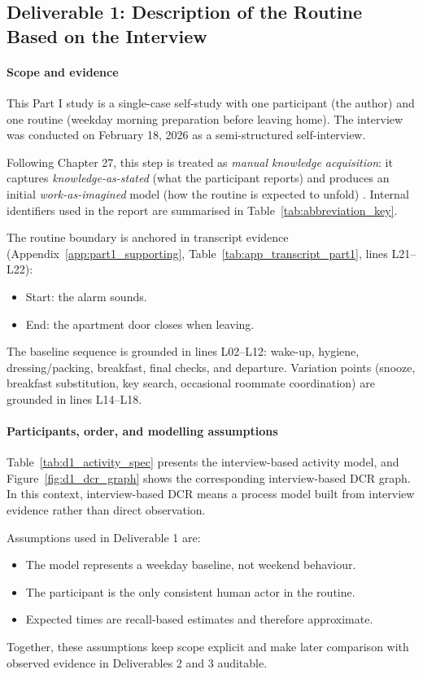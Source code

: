 \subsection{Deliverable 1: Description of the Routine Based on the Interview}
\label{sec:deliverable1}

\paragraph*{Scope and evidence}
This Part I study is a single-case self-study with one participant (the author) and one routine (weekday morning preparation before leaving home). The interview was conducted on February 18, 2026 as a semi-structured self-interview.

Following Chapter 27, this step is treated as \textit{manual knowledge acquisition}: it captures \textit{knowledge-as-stated} (what the participant reports) and produces an initial \textit{work-as-imagined} model (how the routine is expected to unfold) . Internal identifiers used in the report are summarised in Table~\ref{tab:abbreviation_key}.

The routine boundary is anchored in transcript evidence (Appendix~\ref{app:part1_supporting}, Table~\ref{tab:app_transcript_part1}, lines L21--L22):
\begin{itemize}
  \item Start: the alarm sounds.
  \item End: the apartment door closes when leaving.
\end{itemize}

The baseline sequence is grounded in lines L02--L12: wake-up, hygiene, dressing/packing, breakfast, final checks, and departure. Variation points (snooze, breakfast substitution, key search, occasional roommate coordination) are grounded in lines L14--L18.

\paragraph*{Participants, order, and modelling assumptions}
Table~\ref{tab:d1_activity_spec} presents the interview-based activity model, and Figure~\ref{fig:d1_dcr_graph} shows the corresponding interview-based DCR graph. In this context, interview-based DCR means a process model built from interview evidence rather than direct observation.

Assumptions used in Deliverable 1 are:
\begin{itemize}
  \item The model represents a weekday baseline, not weekend behaviour.
  \item The participant is the only consistent human actor in the routine.
  \item Expected times are recall-based estimates and therefore approximate.
\end{itemize}

Together, these assumptions keep scope explicit and make later comparison with observed evidence in Deliverables 2 and 3 auditable.

